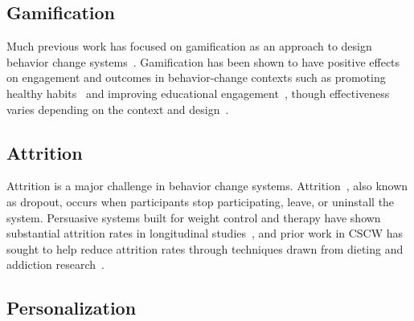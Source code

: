 


\subsection{Gamification}

Much previous work has focused on gamification as an approach to design behavior change systems~\cite{deterding2011game}. Gamification has been shown to have positive effects on engagement and outcomes in behavior-change contexts such as promoting healthy habits~\cite{cugelman2013gamification, lyons2014behavior} and improving  educational engagement~\cite{anderson2013steering, anderson2014engaging}, though effectiveness varies depending on the context and design~\cite{6758978}. %

\subsection{Attrition}

Attrition is a major challenge in behavior change systems. Attrition~\cite{eysenbach2005law}, also known as dropout, occurs when participants stop participating, leave, or uninstall the system. Persuasive systems built for weight control and therapy have shown substantial attrition rates in longitudinal studies~\cite{Bernier1986,paredes2014poptherapy}, and prior work in CSCW has sought to help reduce attrition rates through techniques drawn from dieting and addiction research~\cite{agapie2016staying}. %

\subsection{Personalization}


